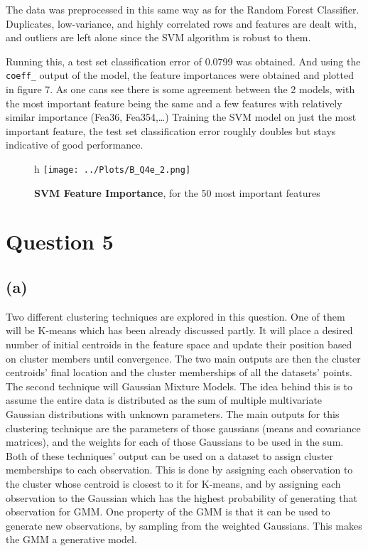 \documentclass[12pt]{report} %
\begin{document}
The data was preprocessed in this same way as for the Random Forest Classifier. Duplicates, low-variance, and highly correlated rows and features are dealt with, and outliers are left alone since the SVM algorithm is robust to them.  

Running this, a test set classification error of 0.0799 was obtained. And using the \texttt{coeff\_} output of the model, the feature importances were obtained and plotted in figure 7. As one cans see there is some agreement between the 2 models, with the most important feature being the same and a few features with relatively similar importance (Fea36, Fea354,\ldots)  
Training the SVM model on just the most important feature, the test set classification error roughly doubles but stays indicative of good performance.

\begin{figure}{h}
    \centering
    \texttt{[image: ../Plots/B\_Q4e\_2.png]}
    \caption{\textbf{SVM Feature Importance}, for the 50 most important features}
\end{figure}

\newpage

\section*{Question 5}

\subsection*{(a)}

Two different clustering techniques are explored in this question. One of them will be K-means which has been already discussed partly. It will place a desired number of initial centroids in the feature space and update their position based on cluster members until convergence. The two main outputs are then the cluster centroids' final location and the cluster memberships of all the datasets' points.  
The second technique will Gaussian Mixture Models. The idea behind this is to assume the entire data is distributed as the sum of multiple multivariate Gaussian distributions with unknown parameters\cite[p. 260]{sklearn_book}. The main outputs for this clustering technique are the parameters of those gaussians (means and covariance matrices), and the weights for each of those Gaussians to be used in the sum.  
Both of these techniques' output can be used on a dataset to assign cluster memberships to each observation. This is done by assigning each observation to the cluster whose centroid is closest to it for K-means, and by assigning each observation to the Gaussian which has the highest probability of generating that observation for GMM. One property of the GMM is that it can be used to generate new observations, by sampling from the weighted Gaussians. This makes the GMM a generative model.  
\end{document}
